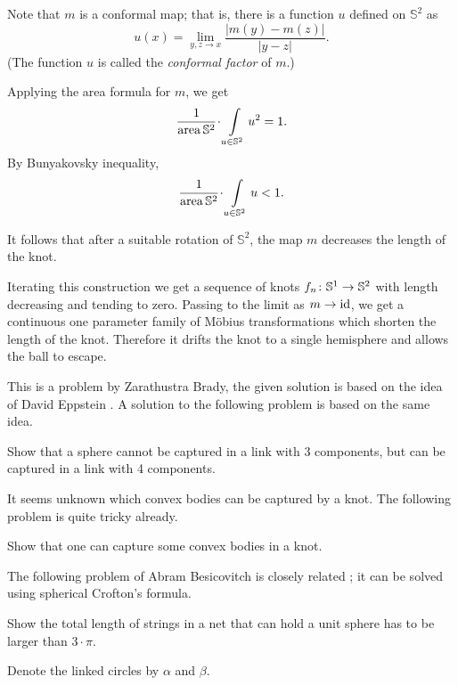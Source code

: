 Note that $m$ is a conformal map;
that is, there is a function $u$ defined on $\mathbb{S}^2$ 
as 
\[u(x)=\lim_{y,z\to x}\frac{|m(y)-m(z)|}{|y-z|}.\]
(The function $u$ is called the \emph{conformal factor} of $m$.)

Applying the area formula for $m$,
we get 
$$\frac1{\area \mathbb{S}^2}\cdot\int\limits_{u\in\mathbb{S}^2} u^2=1.$$ 
By Bunyakovsky inequality, 
$$\frac1{\area \mathbb{S}^2}\cdot\int\limits_{u\in\mathbb{S}^2} u<1.$$ 

It follows that after a suitable rotation of $\mathbb{S}^2$, 
the map $m$ decreases the length of the knot.

Iterating this construction we get a sequence of knots $f_n\:\mathbb{S}^1\z\to\mathbb{S}^2$ with length decreasing  and tending to zero.
Passing to the limit as $m\to\operatorname{\rm id}$, we get a continuous one parameter family of Möbius transformations which shorten the length of the knot.
Therefore it drifts the knot to a single hemisphere and allows the ball to escape. 
\qeds


This is a problem by Zarathustra Brady, 
the given solution is based on the idea of David Eppstein \cite{zeb}.
A solution to the following problem is based on the same idea.

\begin{pr}
Show that a sphere cannot be captured in a link with 3 components, but can be captured in a link with 4 components.
\end{pr}

It seems unknown which convex bodies can be captured by a knot.
The following problem is quite tricky already.

\begin{pr}
Show that one can capture some convex bodies in a knot.
\end{pr}

The following problem of Abram Besicovitch is closely related \cite{besicovitch-sphere}; it can be solved using spherical Crofton's formula.

\begin{pr}
Show the total length of strings in a net that can hold a unit sphere has to be larger than $3\cdot\pi$.
\end{pr}







Denote the linked circles by $\alpha$ and $\beta$. 

